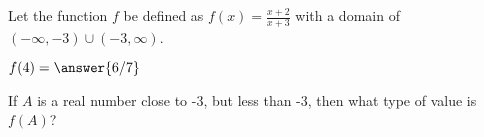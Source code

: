 \documentclass{ximera}
\begin{document}
\begin{definition}
Let the function $f$ be defined as $f(x) = \frac{x+2}{x+3}$ with a domain of $(-\infty, -3) \cup (-3, \infty)$. 

\end{definition}




\begin{exercise}
$f(4) = \answer{6/7} $ 
\end{exercise}





\begin{exercise}
If $A$ is a real number close to -3, but less than -3, then what type of value is $f(A)$?

\begin{multipleChoice}
\end{multipleChoice}

\end{exercise}
\end{document}
